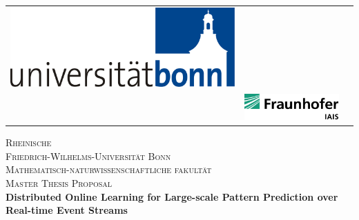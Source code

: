 \begin{titlepage}
		\begin{center}
			\setlength{\tabcolsep}{0pt}
			\begin{tabular}{>{\raggedleft}m{2.5cm}>{\centering}m{\dimexpr\textwidth - 5cm\relax}>{\raggedright}m{2.5cm}}
				\includegraphics[width=\linewidth]{figures/logo.pdf}%
				&%
				\textbf{\large } \\[5pt]%
				\textbf{\large}%
				&%
				\includegraphics[width=\linewidth]{figures/iais.pdf} %
			\end{tabular}
			
			
			\textsc{\LARGE Rheinische\\[5mm] Friedrich-Wilhelms-Universität Bonn}\\[1.0cm]
			
			\textsc{\Large Mathematisch-naturwissenschaftliche fakultät}\\[1.0cm]
			
			\textsc{\Large Master Thesis Proposal }\\[1.5cm]
			
			{ \Large \bfseries 
				Distributed Online Learning for Large-scale Pattern Prediction over Real-time Event Streams}\\[1.4cm]
			

\end{center}
\end{titlepage}
